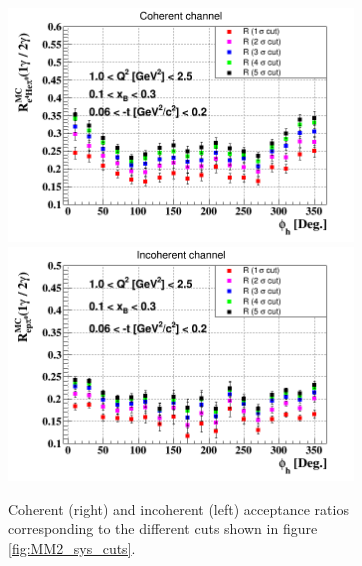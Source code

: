 \begin{figure}[tbp]
   \includegraphics[height=6.2cm]{fig/e4Hegamma_e4Hepi0_Phi_2.png}
   \includegraphics[height=6.2cm]{fig/epgamma_eppi0_Phi.png}
   \caption{Coherent (right) and incoherent (left) acceptance ratios 
corresponding to the different cuts shown in figure \ref{fig:MM2_sys_cuts}. }
\label{fig:R_sys_plot}
\end{figure}


